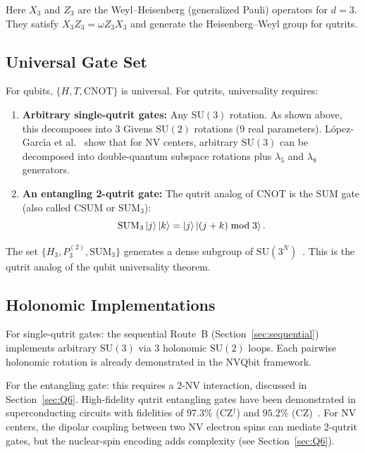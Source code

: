 \documentclass[11pt,letterpaper]{article}
\newcommand{\SU}{\mathrm{SU}}
\begin{document}
Here $X_3$ and $Z_3$ are the Weyl--Heisenberg (generalized Pauli) operators for $d = 3$.
They satisfy $X_3 Z_3 = \omega Z_3 X_3$ and generate the Heisenberg--Weyl group for
qutrits.

\subsection{Universal Gate Set}

For qubits, $\{H, T, \text{CNOT}\}$ is universal. For qutrits, universality requires:

\begin{enumerate}
  \item \textbf{Arbitrary single-qutrit gates:} Any $\SU(3)$ rotation. As shown above,
    this decomposes into 3 Givens $\SU(2)$ rotations (9 real parameters).
    L\'{o}pez-Garc\'{\i}a et al.~\cite{LopezGarcia2026} show that for NV centers, %
    arbitrary $\SU(3)$ can be decomposed into double-quantum subspace rotations plus
    $\lambda_5$ and $\lambda_8$ generators.
  \item \textbf{An entangling 2-qutrit gate:} The qutrit analog of CNOT is the SUM gate
    (also called CSUM or $\text{SUM}_3$):
    \begin{equation}
      \text{SUM}_3 \ket{j}\ket{k} = \ket{j}\ket{(j+k) \bmod 3}.
      \label{eq:sum3}
    \end{equation}
\end{enumerate}

The set $\{H_3, P_3^{(2)}, \text{SUM}_3\}$ generates a dense subgroup of
$\SU(3^N)$~\cite{Brylinski2002}. %
This is the qutrit analog of the qubit universality
theorem.

\subsection{Holonomic Implementations}

For single-qutrit gates: the sequential Route~B (Section~\ref{sec:sequential}) implements
arbitrary $\SU(3)$ via 3 holonomic $\SU(2)$ loops. Each pairwise holonomic rotation is
already demonstrated in the NVQbit framework.

For the entangling gate: this requires a 2-NV interaction, discussed in
Section~\ref{sec:Q6}. High-fidelity qutrit entangling gates have been demonstrated in
superconducting circuits with fidelities of $97.3\%$ (CZ$^\dagger$) and $95.2\%$
(CZ)~\cite{Goss2022}. %
For NV centers, the dipolar coupling between two NV electron spins
can mediate 2-qutrit gates, but the nuclear-spin encoding adds complexity (see
Section~\ref{sec:Q6}).
\end{document}
